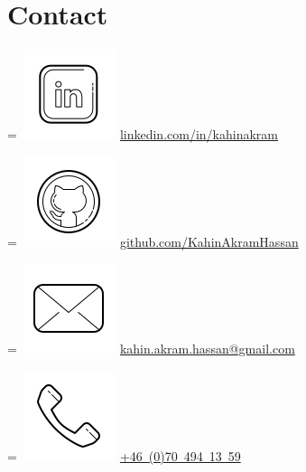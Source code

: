 \documentclass[a4paper]{plushcv}
\begin{document}
\hfill
\begin{minipage}[t]{0.28\textwidth} 

\section{Contact}

\begingroup
{}=\hbox{
	\includegraphics[scale=0.1,trim={0 1cm 0cm 0cm}]{icons/main/linkedin.png}\hspace{0.1cm} \href{https://www.linkedin.com/in/kahinakram/}{linkedin.com/in/kahinakram}
}
\parbox{\wd0}{}
\endgroup

\begingroup
{}=\hbox{
	\includegraphics[scale=0.1,trim={0 1cm 0cm 0cm}]{icons/main/github.png}\hspace{0.1cm} \href{https://github.com/KahinAkramHassan}{github.com/KahinAkramHassan}
}
\parbox{\wd0}{}
\endgroup


\begingroup
{}=\hbox{
	\includegraphics[scale=0.1,trim={0 1cm 0cm 0cm}]{icons/main/mail.png}\hspace{0.1cm} \href{mailto:kahin.akram.hassan@gmail.com}{kahin.akram.hassan@gmail.com}
}
\parbox{\wd0}{}
\endgroup


\begingroup
{}=\hbox{
	\includegraphics[scale=0.1,trim={0 1cm 0cm 0cm}]{icons/main/phone.png}\hspace{0.1cm}
	\href{tel:+46704941359}{+46 (0)70 494 13 59}
}
\parbox{\wd0}{}\endgroup


\end{minipage}
\end{document}
